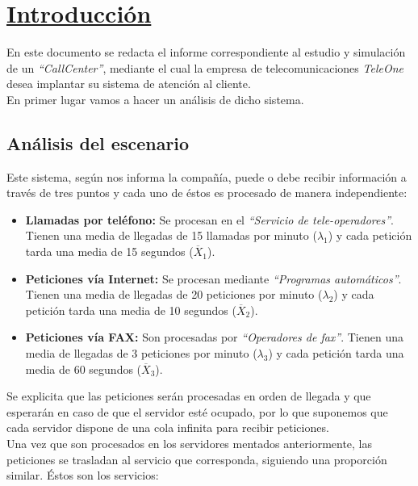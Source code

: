 \section{\textbf{\underline{Introducción}}}

En este documento se redacta el informe correspondiente al estudio y simulación de un \emph{``CallCenter''}, mediante el cual la empresa de telecomunicaciones \emph{TeleOne} desea implantar su sistema de atención al cliente.\\

En primer lugar vamos a hacer un análisis de dicho sistema.

\subsection{Análisis del escenario}
Este sistema, según nos informa la compañía, puede o debe recibir información a través de tres puntos y cada uno de éstos es procesado de manera independiente:

\begin{itemize}
  \item \textbf{Llamadas por teléfono:} Se procesan en el \emph{``Servicio de tele-operadores''}. Tienen una media de llegadas de 15 llamadas por minuto ($\lambda_{1}$) y cada petición tarda una media de 15 segundos ($\overline{X}_{1}$).
  \item \textbf{Peticiones vía Internet:} Se procesan mediante \emph{``Programas automáticos''}. Tienen una media de llegadas de 20 peticiones por minuto ($\lambda_{2}$) y cada petición tarda una media de 10 segundos ($\overline{X}_{2}$).
  \item \textbf{Peticiones vía FAX:} Son procesadas por \emph{``Operadores de fax''}. Tienen una media de llegadas de 3 peticiones por minuto ($\lambda_{3}$) y cada petición tarda una media de 60 segundos ($\overline{X}_{3}$).
\end{itemize}

Se explicita que las peticiones serán procesadas en orden de llegada y que esperarán en caso de que el servidor esté ocupado, por lo que suponemos que cada servidor dispone de una cola infinita para recibir peticiones.\\

Una vez que son procesados en los servidores mentados anteriormente, las peticiones se trasladan al servicio que corresponda, siguiendo una proporción similar. Éstos son los servicios:

